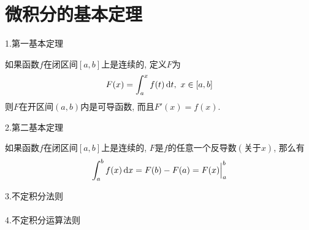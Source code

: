 \chapter{微积分的基本定理}
1.第一基本定理\\[-4ex]
\begin{theorem}[微积分的第一基本定理:]
如果函数$f$在闭区间$[a,b]$上是连续的, 定义$F$为
\[F(x)=\int_a^xf(t)\dif t,\ x\in[a,b]\]
则$F$在开区间$(a,b)$内是可导函数, 而且$F'(x)=f(x)$.
\end{theorem}\vspace{4ex}

2.第二基本定理\\[-4ex]
\begin{theorem}[微积分的第二基本定理:]
如果函数$f$在闭区间$[a,b]$上是连续的, $F$是$f$的任意一个反导数$(\text{关于}x)$, 那么有
\[\int_a^bf(x)\mathop{}\!\mathrm{d} x=F(b)-F(a)=F(x)\Big|_a^b\]
\end{theorem}\vspace{4ex}

3.不定积分法则\\[1ex]
\\[4ex]

4.不定积分运算法则\\[-4ex]
\begin{center}
\\[2ex]
\end{center}\vspace{4ex}

